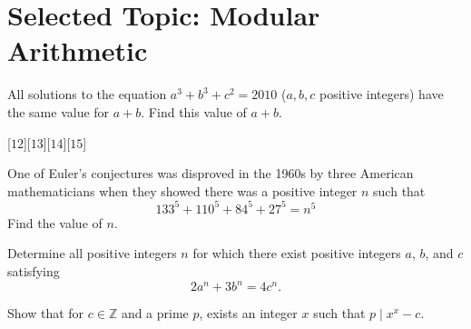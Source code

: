 

\DeclareRobustCommand{\stirling}{\genfrac\{\}{0pt}{}}
\setcounter{secnumdepth}{0} 

\newcommand{\weekNum}{5} %
\newcommand{\meetingDate}{February 19th, 2025} 


\pagestyle{empty}
\sloppy
\maketitle

\section{Selected Topic: Modular Arithmetic} %

\begin{problem}
    All solutions to the equation \( a^3 + b^3 + c^2 = 2010 \) (\( a, b, c \) positive integers) have the same value for \( a + b \). Find this value of \( a + b \).
\end{problem}
[$12$][$13$][$14$][$15$]

\begin{problem}[N][4][AIME 1989/9]
    One of Euler's conjectures was disproved in the 1960s by three American mathematicians when they showed there was a positive integer $n$ such that
    $$ 133^5 + 110^5 + 84^5 + 27^5 = n^5 $$
    Find the value of $n$.
\end{problem}

\begin{problem}[N][4][Putnam 2024/A1]
    Determine all positive integers $n$ for which there exist positive integers $a$, $b$, and $c$ satisfying
    \[
    2a^n + 3b^n = 4c^n.
    \]
\end{problem}

\begin{problem}[N][3][AoPS]
    Show that for $c \in \mathbb{Z}$ and a prime $p$, exists an integer $x$ such that $p \mid  x^x - c$.
\end{problem}

